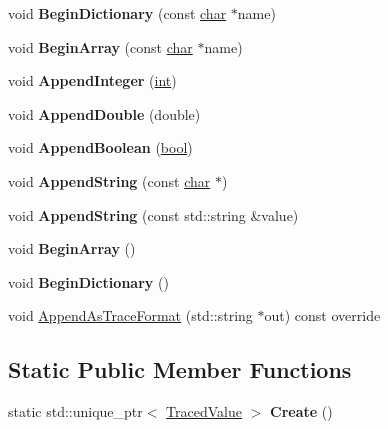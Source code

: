 \begin{DoxyCompactItemize}
void {\bfseries Begin\+Dictionary} (const \mbox{\hyperlink{classchar}{char}} $\ast$name)
\item 
\mbox{\label{classv8_1_1tracing_1_1TracedValue_ac0c5414e7634c2c02105b5ae07edb4df}} 
void {\bfseries Begin\+Array} (const \mbox{\hyperlink{classchar}{char}} $\ast$name)
\item 
\mbox{\label{classv8_1_1tracing_1_1TracedValue_adfc4ae30653fdfc688334391d7f1063a}} 
void {\bfseries Append\+Integer} (\mbox{\hyperlink{classint}{int}})
\item 
\mbox{\label{classv8_1_1tracing_1_1TracedValue_a8f82bc850922fb6643635bd0bfaad024}} 
void {\bfseries Append\+Double} (double)
\item 
\mbox{\label{classv8_1_1tracing_1_1TracedValue_aad1a3b416c12c41b85ff27d1f063e713}} 
void {\bfseries Append\+Boolean} (\mbox{\hyperlink{classbool}{bool}})
\item 
\mbox{\label{classv8_1_1tracing_1_1TracedValue_a5edbf5910b397941387973eb928345ec}} 
void {\bfseries Append\+String} (const \mbox{\hyperlink{classchar}{char}} $\ast$)
\item 
\mbox{\label{classv8_1_1tracing_1_1TracedValue_a04cf45559656695c0c77e110761306cb}} 
void {\bfseries Append\+String} (const std\+::string \&value)
\item 
\mbox{\label{classv8_1_1tracing_1_1TracedValue_ad588cbdf8abda3289c0ec7b55b98fcbd}} 
void {\bfseries Begin\+Array} ()
\item 
\mbox{\label{classv8_1_1tracing_1_1TracedValue_a3f77a895bbed3cccc54af4c9b1721e68}} 
void {\bfseries Begin\+Dictionary} ()
\item 
void \mbox{\hyperlink{classv8_1_1tracing_1_1TracedValue_a87e2daa913cf7f97deaeca85dcbbfa3a}{Append\+As\+Trace\+Format}} (std\+::string $\ast$out) const override
\end{DoxyCompactItemize}
\subsection*{Static Public Member Functions}
\begin{DoxyCompactItemize}
\item 
\mbox{\label{classv8_1_1tracing_1_1TracedValue_aeed37b2670611319618ffd75c3b0dc24}} 
static std\+::unique\+\_\+ptr$<$ \mbox{\hyperlink{classv8_1_1tracing_1_1TracedValue}{Traced\+Value}} $>$ {\bfseries Create} ()
\end{DoxyCompactItemize}


